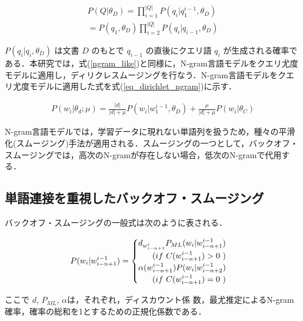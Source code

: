 \begin{equation}
\begin{split}
    P(Q|\theta_D) = \prod_{i=1}^{|Q|} P(q_i|q^{i-1}_{1}, \theta_D) \\
    = P(q_1, \theta_D) \prod_{i=2}^{|Q|} P(q_i|q_{i-1}, \theta_D)
    \label{ngram_like}
\end{split}
\end{equation}

$P(q_i|q_i, \theta_D)$ は文書 $D$ のもとで $q_{i-1}$ の直後にクエリ語 $q_i$ が生成される確率である．本研究では，式(\ref{ngram_like})と同様に，N-gram言語モデルをクエリ尤度モデルに適用し，ディリクレスムージングを行なう．N-gram言語モデルをクエリ尤度モデルに適用した式を式(\ref{eq_dirichlet_ngram})に示す．

\begin{equation}
\begin{split}
    P(w_i|\theta_d;\mu) = \frac{|d|}{|d|+\mu} P(w_i|w^{i-1}_{1}, \theta_D)
    + \frac{\mu}{|d|+\mu} P(w_i|\theta_C)  
    \label{eq_dirichlet_ngram}
\end{split}
\end{equation}

N-gram言語モデルでは，学習データに現れない単語列を扱うため，種々の平滑化(スムージング)手法が適用される．スムージングの一つとして，バックオフ・スムージングでは，高次のN-gramが存在しない場合，低次のN-gramで代用する．

\subsection{単語連接を重視したバックオフ・スムージング}
バックオフ・スムージングの一般式は次のように表される．

\begin{equation}
		P(w_i|w_{i-n+1}^{i-1}) = 
    \begin{cases} 
        d_{w_{i-n+1}^i} P_{ML}(w_i|w_{i-n+1}^{i-1}) \\
        \hspace{\fill} (if\ C(w_{i-n+1}^{i-1}) > 0\ )\\ 
        \alpha(w_{i-n+1}^{i-1})P(w_i|w_{i-n+2}^{i-1})\\ 
        \hspace{\fill} (if\ C(w_{i-n+1}^{i-1}) = 0\ )
    \end{cases} 
    \label{ngram_smoosing1}
\end{equation}

ここで $d$, $P_{ML}$, $\alpha$は，それぞれ，ディスカウント係
数，最尤推定によるN-gram確率，確率の総和を1とするための正規化係数である．

